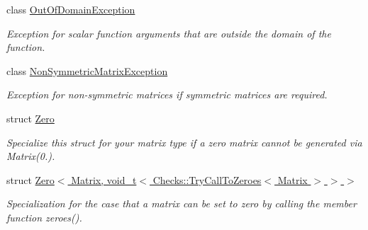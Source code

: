 \begin{DoxyCompactItemize}
class \hyperlink{classRFFGen_1_1OutOfDomainException}{Out\-Of\-Domain\-Exception}
\begin{DoxyCompactList}\small\item\em Exception for scalar function arguments that are outside the domain of the function. \end{DoxyCompactList}\item 
class \hyperlink{classRFFGen_1_1NonSymmetricMatrixException}{Non\-Symmetric\-Matrix\-Exception}
\begin{DoxyCompactList}\small\item\em Exception for non-\/symmetric matrices if symmetric matrices are required. \end{DoxyCompactList}\item 
struct \hyperlink{structRFFGen_1_1Zero}{Zero}
\begin{DoxyCompactList}\small\item\em Specialize this struct for your matrix type if a zero matrix cannot be generated via Matrix(0.). \end{DoxyCompactList}\item 
struct \hyperlink{structRFFGen_1_1Zero_3_01Matrix_00_01void__t_3_01Checks_1_1TryCallToZeroes_3_01Matrix_01_4_01_4_01_4}{Zero$<$ Matrix, void\-\_\-t$<$ Checks\-::\-Try\-Call\-To\-Zeroes$<$ Matrix $>$ $>$ $>$}
\begin{DoxyCompactList}\small\item\em Specialization for the case that a matrix can be set to zero by calling the member function zeroes(). \end{DoxyCompactList}\end{DoxyCompactItemize}
